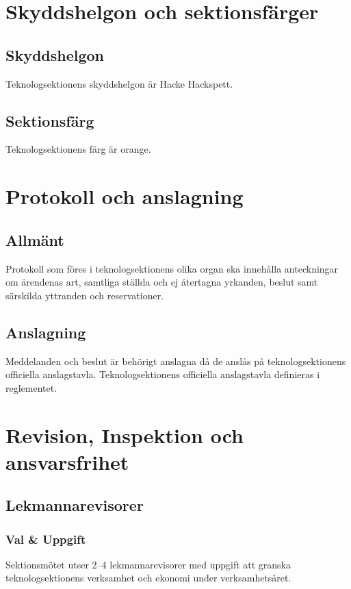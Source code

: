 \documentclass[a4paper]{dtek}
\begin{document}
\section{Skyddshelgon och sektionsfärger}
\subsection{Skyddshelgon}
Teknologsektionens skyddshelgon är Hacke Hackspett.
\subsection{Sektionsfärg}
Teknologsektionens färg är orange.
\newpage

\section{Protokoll och anslagning}
\subsection{Allmänt}
Protokoll som föres i teknologsektionens olika organ ska innehålla anteckningar om ärendenas art, samtliga ställda och ej återtagna yrkanden, beslut samt särskilda yttranden och reservationer.
\subsection{Anslagning}
Meddelanden och beslut är behörigt anslagna då de anslås på teknologsektionens officiella anslagstavla.
Teknologsektionens officiella anslagstavla definieras i reglementet.
\newpage

\section{Revision, Inspektion och ansvarsfrihet}
\subsection{Lekmannarevisorer}
\subsubsection{Val \& Uppgift}
Sektionsmötet utser 2–4 lekmannarevisorer med uppgift att granska teknologsektionens verksamhet och ekonomi under verksamhetsåret.
\end{document}
